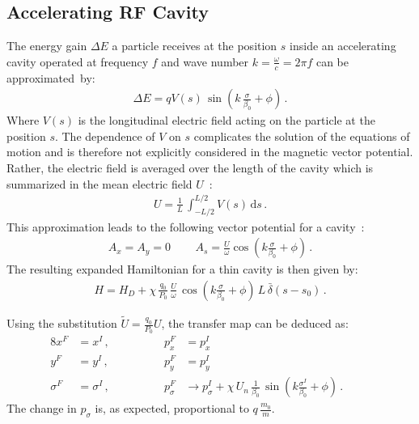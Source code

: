 \subsection{Accelerating RF Cavity}


The energy gain $\Delta E$ a particle receives at the position $s$ inside an accelerating cavity operated at frequency $f$ and wave number $k = \frac{\omega}{c} = 2 \pi f$ can be \mbox{approximated by}:
%
\begin{align}
  \Delta E = q  V(s) \, \sin \left( k \, \frac{\sigma}{\beta_0} + \phi \right) \, .
\end{align}
%
Where $V(s)$ is the longitudinal electric field acting on the particle at the position $s$. The dependence of $V$ on $s$ complicates the solution of the equations of motion and is therefore not explicitly considered in the magnetic vector potential. Rather, the electric field is averaged over the length of the cavity which is summarized in the mean electric field $U$~\cite{wolski2014beam}:
%
\begin{align}
  U = \frac{1}{L} \, \int_{-L/2}^{L/2} V(s) \, \mathrm{d} s \, .
\end{align}
%
This approximation leads to the following vector potential for a cavity~\cite{CERN-SL-95-12}:
%
\begin{align}
A_x = A_y =0 \, \quad \quad A_s =  \frac{U}{\omega} \cos \left(k \frac{\sigma}{\beta_0} + \phi  \right) \, .
\end{align}
%
The resulting expanded Hamiltonian for a thin cavity is then given by:
%
\begin{align}
  H = H_D + \chi \, \frac{q_0}{P_0} \, \frac{U}{\omega} \, \cos \left(k \frac{\sigma}{\beta_0} + \phi  \right) \, L \, \bar{\delta}(s-s_0) \, .
\end{align}

%
Using the substitution $\tilde{U} = \frac{q_0}{P_0} U$, the transfer map can be deduced as:
%
\begin{alignat}{8}
x^F & =  x^I \, ,  \quad \quad \quad \quad &p_x^F &=   p_x^I && \\ 
y^F & =  y^I \, ,  \quad \quad \quad \quad &p_y^F &=  p_y^I &&  \\ 
\sigma^F & =  \sigma^I \, ,  \quad \quad \quad \quad &p_\sigma^F &\rightarrow  p_\sigma^I +\chi \, U_n \, \frac{1}{\beta_0}\, \sin \left( k \frac{\sigma^I}{\beta_0} + \phi \right) \, .   &&  &
\end{alignat}
%
The change in $p_\sigma$ is, as expected, proportional to $q\, \frac{m_0}{m}$.




